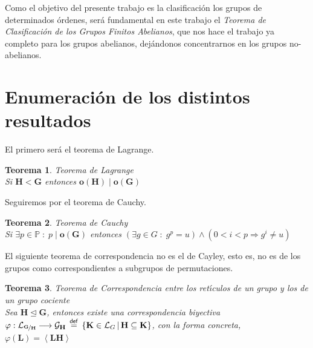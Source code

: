 \documentclass[final,12pt,a4paper,twoside,fleqn]{extbook}
\newcommand{\sthen}{\ensuremath{         \Rightarrow         }}
\newcommand{\entreparentesis}[1]{\ensuremath{
        \left({#1}\right)
}}
\newcommand{\entreangulos}[1]{\ensuremath{\left\langle{#1}\right\rangle}}
\newcommand{\mathdef}{\ensuremath{\stackrel{\mathsf{def}}{{}={}}}}
\newcommand{\then}{\ensuremath{\sthen}}
\newcommand{\extset}[2]{\ensuremath{
        \left\lbrace{#1}\,\vert\,{#2}\right\rbrace
}}
\newcommand{\To}{\ensuremath{         \longrightarrow         }}
\newcommand{\ly}{\ensuremath{         \wedge         }}
\newcommand{\setP}{\ensuremath{}\mathbb{P}}
\newcommand{\generadoporUitem}[1]{\ensuremath{
        \entreangulos{#1}
}}
\newcommand{\generadopor}[1]{\ensuremath{
        \generadoporUitem{#1}
}}
\newcommand{\grG}{\ensuremath{\mathbf{G}}}
\newcommand{\grH}{\ensuremath{\mathbf{H}}}
\newcommand{\grK}{\ensuremath{\mathbf{K}}}
\newcommand{\grL}{\ensuremath{\mathbf{L}}}
\newcommand{\subgr}{\ensuremath{<}}
\newcommand{\normsubgreq}{\ensuremath{\trianglelefteq}}
\newcommand{\grlattice}[1]{\ensuremath{
        {\mathcal{L}}_{#1}
}}
\newcommand{\grcoc}[2]{\ensuremath{
        \nicefrac{#1}{#2}
}}
\newtheorem{thm}{Teorema}[chapter]
\theoremstyle{definition}
\theoremstyle{remark}
\begin{document}
Como el objetivo del presente trabajo es la clasificaci\'on los grupos de
determinados \'ordenes, ser\'a fundamental en este trabajo el \emph{Teorema de
Clasificaci\'on de los Grupos Finitos Abelianos}, que nos hace el trabajo
 ya completo para los grupos abelianos,
 dej\'andonos concentrarnos en los grupos no-abelianos.

\section{Enumeraci\'on de los distintos resultados}

El primero ser\'a el teorema de Lagrange.
\begin{thm}{Teorema de Lagrange\\}{\label{ThLagrange}}
    Si $\grH\subgr\grG$ entonces $\mathbf{o}\left(\grH\right) ∣\mathbf{o}\left(\grG\right)$
\end{thm}

Seguiremos por el teorema de Cauchy.
\begin{thm}{Teorema de Cauchy\\}{\label{ThCauchy}}
    Si $         \exists          p         \in \setP\; : \; p ∣\mathbf{o}\left(\grG\right)$ entonces
    $\left(         \exists          g         \in G\; : \; g^p=u \right)\ly \left(0<i<p \then g^i         \neq          u\right)$
\end{thm}

El siguiente teorema de correspondencia no es el de Cayley, esto es, no es de los grupos como correspondientes a subgrupos de permutaciones.
\begin{thm}{Teorema de Correspondencia entre los ret{\'{\i}}culos de un grupo y los de un grupo cociente\\}{\label{ThCorresp}}
   Sea $\grH \normsubgreq \grG$, entonces existe una correspondencia biyectiva $\varphi: \grlattice{\grcoc{\grG}{\grH}}\To \mathcal{G}_\grH\mathdef\extset{\grK         \in \grlattice{G}}{\grH         \subseteq \grK}$, con la forma concreta, $\varphi \entreparentesis{\grL}= \generadopor{\grL\grH}$
\end{thm}
\end{document}
